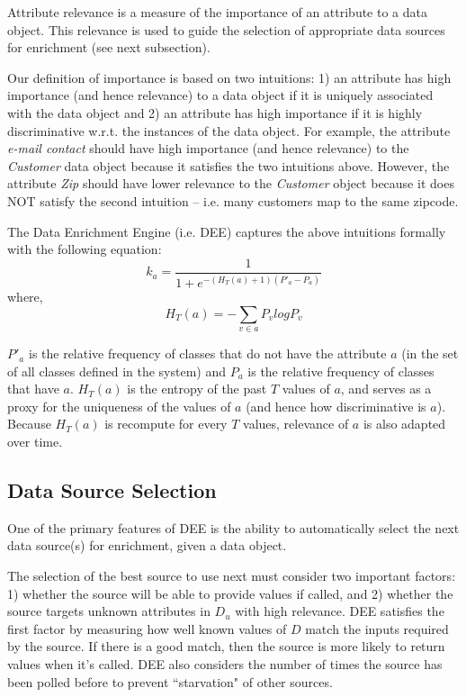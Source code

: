 \documentclass[letterpaper]{article}
\begin{document}
Attribute relevance is a measure of the importance of an attribute to a data object. This relevance is used 
to guide the selection of appropriate data sources for enrichment (see next subsection).

Our definition of importance is based on two intuitions: 1) an attribute has high importance (and hence 
relevance) to a data object if it is uniquely associated with the data object and 2) an attribute has high 
importance if it is highly discriminative w.r.t. the instances of the data object. For example, the attribute 
{\it e-mail contact} should have high importance (and hence relevance) to the {\it Customer} data object 
because it satisfies the two intuitions above. However, the attribute {\it Zip} should have lower relevance
to the {\it Customer} object because it does NOT satisfy the second intuition -- i.e. many customers map
to the same zipcode.

The Data Enrichment Engine (i.e. DEE) captures the above intuitions formally with the following equation:
\begin{equation}
k_a= \frac{1}{1+ e^{-(H_{T}(a) +1)(P'_a - P_a)}}
\end{equation}
where, 
\begin{equation}
H_{T}(a)= - \displaystyle\sum\limits_{v \in a} P_v log P_v
\end{equation}

$P'_a$ is the relative frequency of classes that do not have the attribute $a$ (in the set of all classes 
defined in the system) and $P_a$ is the relative frequency of classes that have $a$. $H_{T}(a)$ is the entropy 
of the past $T$ values of $a$, and serves as a proxy for the uniqueness of the values of $a$ (and hence how 
discriminative is $a$). Because $H_{T}(a)$ is recompute for every $T$ values, relevance of $a$ is also adapted
over time.


\subsection{Data Source Selection} 

One of the primary features of DEE is the ability to automatically select the next data source(s) for 
enrichment, given a data object. 

The selection of the best source to use next must consider two important factors: 1) whether the source will 
be able to provide values if called, and 2) whether the source targets unknown attributes in $D_u$ with high 
relevance. DEE satisfies the first factor by measuring how well known values of $D$ match the inputs required 
by the source. If there is a good match, then the source is more likely to return values when it's called. DEE
also considers the number of times the source has been polled before to prevent ``starvation" of other sources. 
\end{document}
